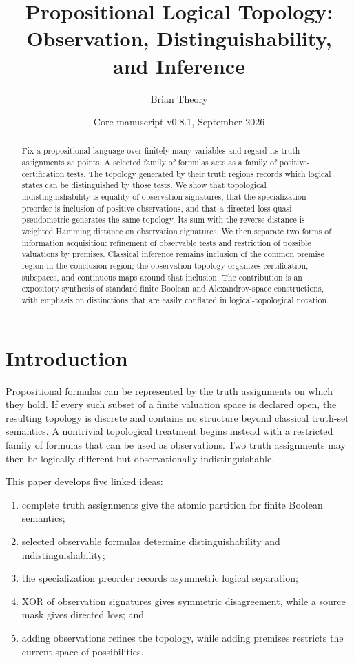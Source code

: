 \documentclass[11pt]{article}
\title{Propositional Logical Topology:\\Observation, Distinguishability, and Inference}
\author{Brian Theory}
\date{Core manuscript v0.8.1, September 2026}
\theoremstyle{definition}
\theoremstyle{plain}
\theoremstyle{remark}
\begin{document}
\maketitle

\begin{abstract}
Fix a propositional language over finitely many variables and regard its truth
assignments as points.  A selected family of formulas acts as a family of
positive-certification tests.  The topology generated by their truth regions
records which logical states can be distinguished by those tests.  We show that
topological indistinguishability is equality of observation signatures, that
the specialization preorder is inclusion of positive observations, and that a
directed loss quasi-pseudometric generates the same topology.  Its sum with the
reverse distance is weighted Hamming distance on observation signatures.  We
then separate two forms of information acquisition: refinement of observable
tests and restriction of possible valuations by premises.  Classical inference
remains inclusion of the common premise region in the conclusion region; the
observation topology organizes certification, subspaces, and continuous maps
around that inclusion.  The contribution is an expository synthesis of standard
finite Boolean and Alexandrov-space constructions, with emphasis on distinctions
that are easily conflated in logical-topological notation.
\end{abstract}

\tableofcontents

\section{Introduction}

Propositional formulas can be represented by the truth assignments on which
they hold.  If every such subset of a finite valuation space is declared open,
the resulting topology is discrete and contains no structure beyond classical
truth-set semantics.  A nontrivial topological treatment begins instead with a
restricted family of formulas that can be used as observations.  Two truth
assignments may then be logically different but observationally
indistinguishable.

This paper develops five linked ideas:
\begin{enumerate}[label=(\roman*)]
\item complete truth assignments give the atomic partition for finite Boolean
      semantics;
\item selected observable formulas determine distinguishability and
      indistinguishability;
\item the specialization preorder records asymmetric logical separation;
\item XOR of observation signatures gives symmetric disagreement, while a
      source mask gives directed loss; and
\item adding observations refines the topology, while adding premises
      restricts the current space of possibilities.
\end{enumerate}
\end{document}
